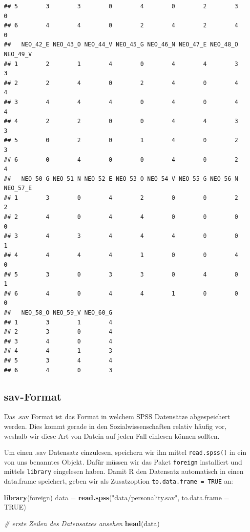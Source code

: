 \documentclass[
]{book}
\newenvironment{Shaded}{\begin{snugshade}}{\end{snugshade}}
\newcommand{\AttributeTok}[1]{\textcolor[rgb]{0.13,0.29,0.53}{#1}}
\newcommand{\CommentTok}[1]{\textcolor[rgb]{0.56,0.35,0.01}{\textit{#1}}}
\newcommand{\ConstantTok}[1]{\textcolor[rgb]{0.56,0.35,0.01}{#1}}
\newcommand{\FunctionTok}[1]{\textcolor[rgb]{0.13,0.29,0.53}{\textbf{#1}}}
\newcommand{\NormalTok}[1]{#1}
\newcommand{\OtherTok}[1]{\textcolor[rgb]{0.56,0.35,0.01}{#1}}
\newcommand{\StringTok}[1]{\textcolor[rgb]{0.31,0.60,0.02}{#1}}
\begin{document}
\begin{verbatim}
## 5        3        3        0        4        0        2        3        0
## 6        4        4        0        2        4        2        4        0
##   NEO_42_E NEO_43_O NEO_44_V NEO_45_G NEO_46_N NEO_47_E NEO_48_O NEO_49_V
## 1        2        1        4        0        4        4        3        3
## 2        2        4        0        2        4        0        4        4
## 3        4        4        4        0        4        0        4        4
## 4        2        2        0        0        4        4        3        3
## 5        0        2        0        1        4        0        2        3
## 6        0        4        0        0        4        0        2        4
##   NEO_50_G NEO_51_N NEO_52_E NEO_53_O NEO_54_V NEO_55_G NEO_56_N NEO_57_E
## 1        3        0        4        2        0        0        2        2
## 2        4        0        4        4        0        0        0        0
## 3        4        3        4        4        4        0        0        1
## 4        4        4        4        1        0        0        4        0
## 5        3        0        3        3        0        4        0        1
## 6        4        0        4        4        1        0        0        0
##   NEO_58_O NEO_59_V NEO_60_G
## 1        3        1        4
## 2        3        0        4
## 3        4        0        4
## 4        4        1        3
## 5        3        4        4
## 6        4        0        3
\end{verbatim}

\subsection{sav-Format}\label{sav-format}

Das .sav Format ist das Format in welchem SPSS Datensätze abgespeichert werden. Dies kommt gerade in den Sozialwissenschaften relativ häufig vor, weshalb wir diese Art von Datein auf jeden Fall einlesen können sollten.

Um einen .sav Datensatz einzulesen, speichern wir ihn mittel \texttt{read.spss()} in ein von uns benanntes Objekt. Dafür müssen wir das Paket \texttt{foreign} installiert und mittels \texttt{library} eingelesen haben. Damit R den Datensatz automatisch in einen data.frame speichert, geben wir als Zusatzoption \texttt{to.data.frame\ =\ TRUE} an:

\begin{Shaded}
\begin{Highlighting}[]
\FunctionTok{library}\NormalTok{(foreign)}
\NormalTok{data }\OtherTok{=} \FunctionTok{read.spss}\NormalTok{(}\StringTok{"data/personality.sav"}\NormalTok{, }\AttributeTok{to.data.frame =} \ConstantTok{TRUE}\NormalTok{)}

\CommentTok{\# erste Zeilen des Datensatzes ansehen}
\FunctionTok{head}\NormalTok{(data)}
\end{Highlighting}
\end{Shaded}
\end{document}
